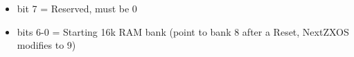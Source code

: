 \begin{itemize}
\item bit 7 = Reserved, must be 0
\item bits 6-0 = Starting 16k RAM bank (point to bank 8 after a Reset, NextZXOS
  modifies to 9)
\end{itemize}

